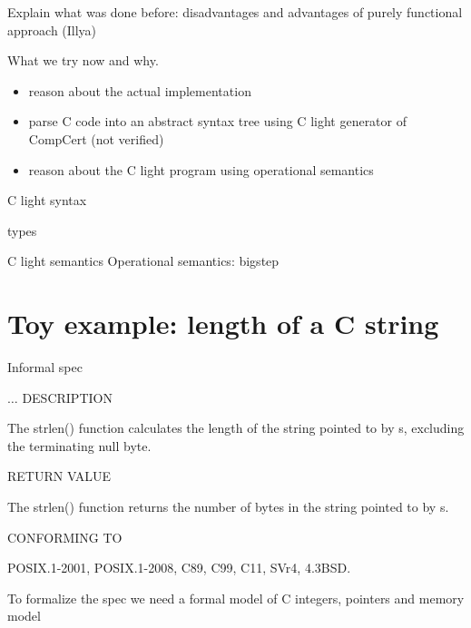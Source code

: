 \documentclass{beamer}
\begin{document}
\begin{frame}
Explain what was done before: disadvantages and advantages of purely functional approach (Illya)
\end{frame}
\begin{frame}
What we try now and why.
\begin{itemize}
\item reason about the actual implementation
\item parse C code into an abstract syntax tree using C light generator of CompCert (not verified)
\item reason about the C light program using operational semantics
\end{itemize}
\end{frame}
\begin{frame}{C light syntax}
\begin{description}
\item[types]
\end{description}

\end{frame}



\begin{frame}{C light semantics}
Operational semantics: bigstep
\end{frame}


\section{Toy example: length of a C string}

\begin{frame}{Informal spec}

$\ldots$
DESCRIPTION        

 The strlen() function calculates the length of the string pointed to
 by s, excluding the terminating null byte.

 \bigskip

RETURN VALUE 

 The strlen() function returns the number of bytes in the string
 pointed to by s.

 \bigskip

CONFORMING TO 

 POSIX.1-2001, POSIX.1-2008, C89, C99, C11, SVr4, 4.3BSD.



\end{frame}

\begin{frame}
 To formalize the spec we need a formal model of C integers, pointers and memory model
\end{frame}
\end{document}
